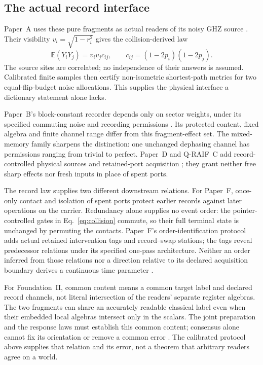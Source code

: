 \documentclass[12pt,a4paper]{article}
\begin{document}
\subsection{The actual record interface}
\label{sec:connection}

Paper~A uses these pure fragments as actual readers of its noisy GHZ
source \cite{Liu2026PaperA}. Their visibility
$v_i=\sqrt{1-r_i^2}$ gives the collision-derived law
\[
 \mathbb E(Y_iY_j)=v_iv_jc_{ij},\qquad
 c_{ij}=(1-2p_i)(1-2p_j).
\]
The source sites are correlated; no independence of their answers is
assumed. Calibrated finite samples then certify non-isometric
shortest-path metrics for two equal-flip-budget noise allocations.
This supplies the physical interface a dictionary statement alone lacks.

Paper~B's block-constant recorder depends only on sector weights,
under its specified commuting noise and recording permissions
\cite{Liu2026PaperB}. Its protected content, fixed algebra and finite
channel range differ from this fragment-effect set. The mixed-memory
family sharpens the distinction: one unchanged dephasing channel has
permissions ranging from trivial to perfect. Paper~D and Q-RAIF~C add
record-controlled physical sources and retained-port acquisition
\cite{Liu2026PaperD,Liu2026QRAIFC}; they grant neither free sharp
effects nor fresh inputs in place of spent ports.

The record law supplies two different downstream relations.
For Paper~F, once-only contact and isolation of spent ports protect
earlier records against later operations on the carrier. Redundancy
alone supplies no event order: the pointer-controlled gates in
Eq.~\eqref{eq:collision} commute, so their full terminal state is
unchanged by permuting the contacts. Paper~F's order-identification
protocol adds actual retained intervention tags and record--swap
stations; the tags reveal predecessor relations under its specified
one-pass architecture. Neither an order inferred from those relations
nor a direction relative to its declared acquisition boundary derives a continuous
time parameter \cite{Liu2026PaperF}.

For Foundation~II, common content means a common target label and
declared record channels, not literal intersection of the readers'
separate register algebras. The two fragments can share an accurately
readable classical label even when their embedded local algebras
intersect only in the scalars. The joint preparation and the response
laws must establish this common content; consensus alone cannot fix
its orientation or remove a common error \cite{FoundationII}.
The calibrated protocol above supplies that relation and its error,
not a theorem that arbitrary readers agree on a world.
\end{document}
